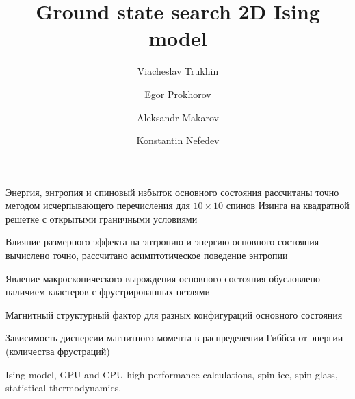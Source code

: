 \documentclass[utf8, babel, sor, jor, amsmath, amssymb, reprint]{elsarticle} %
\begin{document}
\begin{frontmatter}


\title{Ground state search 2D Ising model}

\author[mainaddress, secondaryaddress]{Viacheslav Trukhin}

\author[mainaddress]{Egor Prokhorov}

\author[mainaddress, secondaryaddress]{Aleksandr Makarov}

\author[mainaddress, secondaryaddress]{Konstantin Nefedev}


\address[mainaddress]{Far Eastern Federal University, Vladivostok, Russky Island, 10 Ajax Bay, 690922, the Russian Federation}
\address[secondaryaddress]{Institute of Applied Mathematics, Far Eastern Branch, Russian Academy of Science, Vladivostok, Radio 7, 690041, the Russian Federation}

\begin{abstract}


\end{abstract}


\begin{highlights}
	\item Энергия, энтропия и спиновый избыток основного состояния рассчитаны точно методом исчерпывающего перечисления для $10 \times 10$ спинов Изинга на квадратной решетке с открытыми граничными условиями
	\item Влияние размерного эффекта на энтропию и энергию основного состояния вычислено точно, рассчитано асимптотическое поведение энтропии
	\item Явление макроскопического вырождения основного состояния обусловлено наличием кластеров с фрустрированных петлями
	\item Магнитный структурный фактор для разных конфигураций основного состояния
	\item Зависимость дисперсии магнитного момента в распределении Гиббса от энергии (количества фрустраций)
\end{highlights}


\begin{keyword}
	Ising model, GPU and CPU high performance calculations, spin ice, spin glass, statistical thermodynamics.
\end{keyword}


\end{frontmatter}
\end{document}
